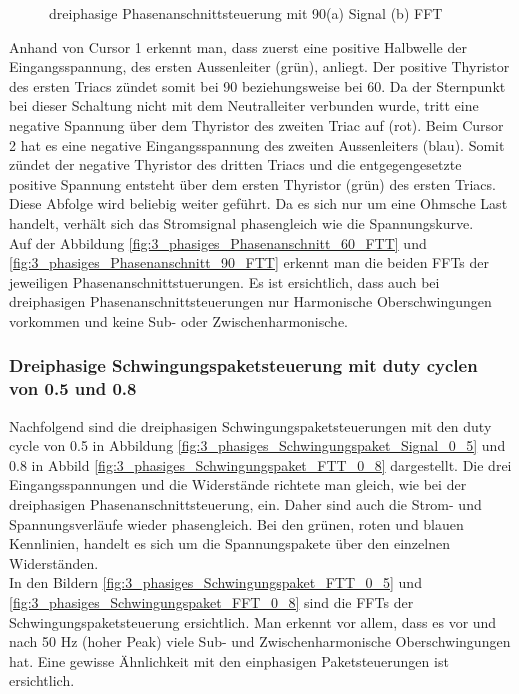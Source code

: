 \begin{figure}[ht!]
	\centering
	\qquad
	\caption{dreiphasige Phasenanschnittsteuerung mit 90\textdegree (a) Signal (b) FFT}
	\label{fig:dreiphasige_Phasenanschnittsteuerung_mit_90}
\end{figure}
Anhand von Cursor 1 erkennt man, dass zuerst eine positive Halbwelle der Eingangsspannung, des ersten Aussenleiter (grün), anliegt. Der positive Thyristor des ersten Triacs zündet somit bei 90\textdegree\hspace{0.02cm} beziehungsweise bei 60\textdegree\hspace{0.02cm}. Da der Sternpunkt bei dieser Schaltung nicht mit dem Neutralleiter verbunden wurde, tritt eine negative Spannung über dem Thyristor des zweiten Triac auf (rot). Beim Cursor 2 hat es eine negative Eingangsspannung des zweiten Aussenleiters (blau). Somit zündet der negative Thyristor des dritten Triacs und die entgegengesetzte positive Spannung entsteht über dem ersten Thyristor (grün) des ersten Triacs. Diese Abfolge wird beliebig weiter geführt. Da es sich nur um eine Ohmsche Last handelt, verhält sich das Stromsignal phasengleich wie die Spannungskurve.\\
Auf der Abbildung \ref{fig:3_phasiges_Phasenanschnitt_60_FTT} und \ref{fig:3_phasiges_Phasenanschnitt_90_FTT} erkennt man die beiden  FFTs der jeweiligen Phasenanschnittstuerungen. Es ist ersichtlich, dass auch bei dreiphasigen Phasenanschnittsteuerungen nur Harmonische Oberschwingungen vorkommen und keine Sub- oder Zwischenharmonische. 

\newpage

\subsubsection{Dreiphasige Schwingungspaketsteuerung mit duty cyclen von 0.5 und 0.8}
Nachfolgend sind die dreiphasigen Schwingungspaketsteuerungen mit den duty cycle von 0.5 in Abbildung \ref{fig:3_phasiges_Schwingungspaket_Signal_0_5} und 0.8 in Abbild \ref{fig:3_phasiges_Schwingungspaket_FTT_0_8} dargestellt. Die drei Eingangsspannungen und die Widerstände richtete man gleich, wie bei der dreiphasigen Phasenanschnittsteuerung, ein. Daher sind auch die Strom- und Spannungsverläufe wieder phasengleich. Bei den grünen, roten und blauen Kennlinien, handelt es sich um die Spannungspakete über den einzelnen Widerständen.\\
In den Bildern \ref{fig:3_phasiges_Schwingungspaket_FTT_0_5} und \ref{fig:3_phasiges_Schwingungspaket_FFT_0_8} sind die FFTs der Schwingungspaketsteuerung ersichtlich. Man erkennt vor allem, dass es vor und nach 50 Hz (hoher Peak) viele Sub- und Zwischenharmonische Oberschwingungen hat. Eine gewisse Ähnlichkeit mit den einphasigen Paketsteuerungen ist ersichtlich.
 

